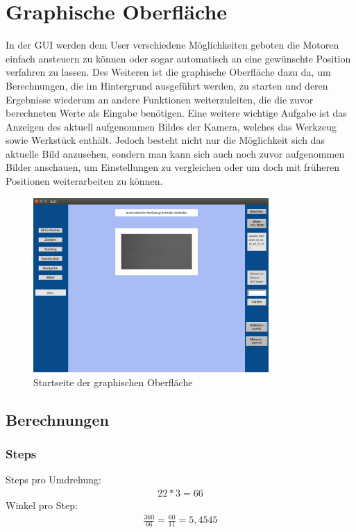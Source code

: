 \documentclass[12pt,a4paper,bibliography=totocnumbered,listof=totocnumbered]{scrartcl}
\begin{document}
\section{Graphische Oberfläche}
In der GUI werden dem User verschiedene Möglichkeiten geboten die Motoren einfach ansteuern zu können oder sogar automatisch an eine gewünschte Position verfahren zu lassen.  Des Weiteren ist die graphische Oberfläche dazu da, um Berechnungen, die im Hintergrund ausgeführt werden, zu starten und deren Ergebnisse wiederum an andere Funktionen weiterzuleiten, die die zuvor berechneten Werte als Eingabe benötigen.
Eine weitere wichtige Aufgabe ist das Anzeigen des aktuell aufgenommen Bildes der Kamera, welches das Werkzeug sowie Werkstück enthält. Jedoch besteht nicht nur die Möglichkeit sich das aktuelle Bild anzusehen, sondern man kann sich auch noch zuvor aufgenommen Bilder anschauen, um Einstellungen zu vergleichen oder um doch mit früheren Positionen weiterarbeiten zu können.
\begin{figure}[htbp]
\centering 
\includegraphics[width=0.8\textwidth]{GUI.png}
\caption{Startseite der graphischen Oberfläche}
\label{fig:Bild8}
\end{figure}

\subsection{Berechnungen}
\subsubsection{Steps}
\label{berechnungSteps}
Steps pro Umdrehung:
\begin{align*}
22*3 = 66
\end{align*}
Winkel pro Step:
\begin{align*}
\frac{360}{66} = \frac{60}{11} = 5,4545
\end{align*}
\end{document}

